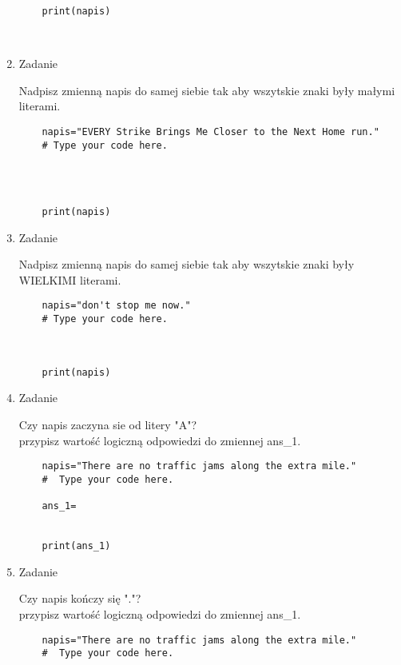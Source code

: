\documentclass[11pt]{article}
\begin{document}
\begin{enumerate}
\begin{lstlisting}
	
	
	print(napis)
	
	
\end{lstlisting}

	\item 
\begin{Large}
	Zadanie
\end{Large}
\par
Nadpisz zmienną napis do samej siebie tak aby wszytskie znaki były małymi literami.
\begin{lstlisting}
	napis="EVERY Strike Brings Me Closer to the Next Home run."
	# Type your code here.
	
	
	
	
	print(napis)
\end{lstlisting}

	\item 
\begin{Large}
	Zadanie
\end{Large}
\par
Nadpisz zmienną napis do samej siebie tak aby wszytskie znaki były WIELKIMI literami.
\begin{lstlisting}
	napis="don't stop me now."
	# Type your code here.
	
	
	
	print(napis)
\end{lstlisting}

	\item 
\begin{Large}
	Zadanie
\end{Large}
\par
Czy napis zaczyna sie od litery "A"?\\
przypisz wartość logiczną odpowiedzi do zmiennej ans\_1.
\begin{lstlisting}
	napis="There are no traffic jams along the extra mile."
	#  Type your code here.
	
	ans_1=
	
	
	print(ans_1)
\end{lstlisting}

	\item 
\begin{Large}
	Zadanie
\end{Large}
\par
Czy napis kończy się "."?\\
przypisz wartość logiczną odpowiedzi do zmiennej ans\_1.
\begin{lstlisting}
	napis="There are no traffic jams along the extra mile."
	#  Type your code here.
	

\end{lstlisting}
\end{enumerate}
\end{document}
